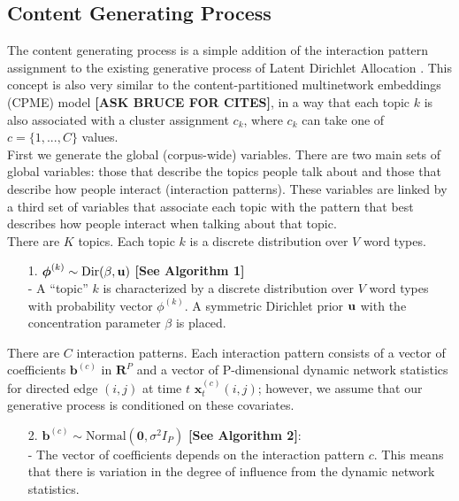 \documentclass[a4paper]{article}
\begin{document}
\subsection{Content Generating Process} \label{subsec: Content Generating Process}
The content generating process is a simple addition of the interaction pattern assignment to the existing generative process of Latent Dirichlet Allocation \cite{Blei2003}. This concept is also very similar to the content-partitioned multinetwork embeddings (CPME) model {\bf [ASK BRUCE FOR CITES]}, in a way that each topic $k$ is also associated with a cluster assignment $c_k$, where $c_k$ can take one of $c = \{1,...,C\}$ values. \\ \newline
First we generate the global (corpus-wide) variables. There are two main sets of global variables:
those that describe the topics people talk about and those that describe how people interact (interaction patterns). These variables are linked by a third set of variables that associate each topic with the pattern that best describes how people interact when talking about that topic.\\ \newline
There are $K$ topics. Each topic $k$ is a discrete distribution over $V$ word types.
\begin{itemize}
	\item[1.] {$\boldsymbol{\phi}^{(k)} \sim \mbox{Dir}(\beta, \bf u)$} \textbf{[See Algorithm 1]}\\
	- A “topic” $k$ is characterized by a discrete distribution over $V$ word types with probability vector $\phi^{(k)}$. A symmetric Dirichlet prior $\bf u$ with the concentration parameter $\beta$ is placed.
\end{itemize}
\noindent There are $C$ interaction patterns. Each interaction pattern consists of a vector of coefficients $\boldsymbol{b}^{(c)}$ in $\boldsymbol{R}^{P}$ and a vector of P-dimensional dynamic network statistics for directed edge $(i, j)$ at time $t$ $\boldsymbol{x}^{(c)}_t(i, j)$; however, we assume that our generative process is conditioned on these covariates. 
\begin{itemize}
	\item[2.] $\boldsymbol{b}^{(c)}\sim \mbox{Normal}(\textbf{0}, \sigma^2I_P)$ \textbf{[See Algorithm 2]}: \\
		- The vector of coefficients depends on the interaction pattern $c$. This means that there is variation in the degree of influence from the dynamic network statistics.
	\end{itemize}
\end{document}
